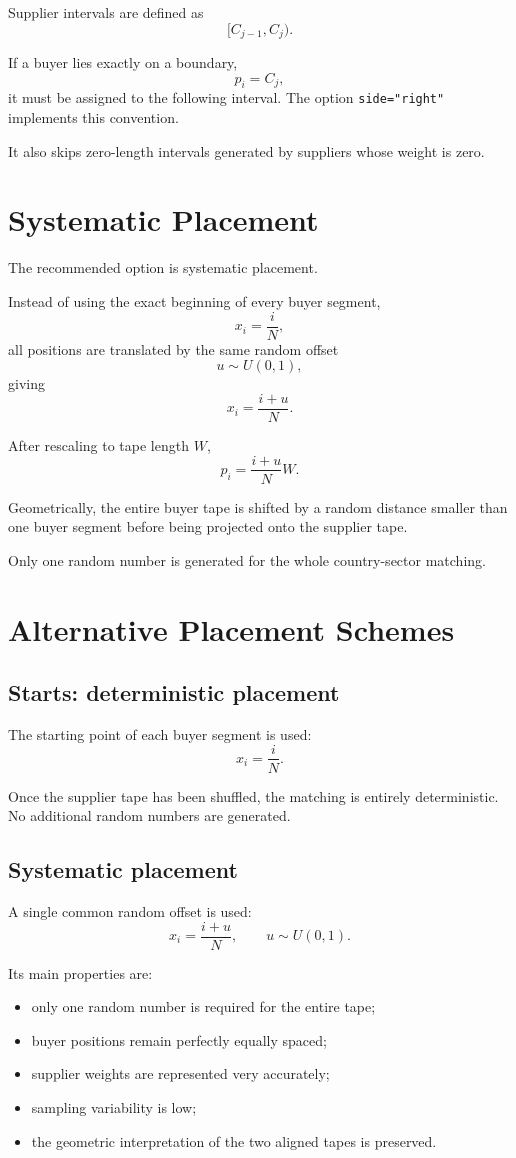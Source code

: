 \documentclass[11pt,a4paper]{article}
\begin{document}
Supplier intervals are defined as
\[
[C_{j-1},C_j).
\]

If a buyer lies exactly on a boundary,
\[
p_i=C_j,
\]
it must be assigned to the following interval. The option
\texttt{side="right"} implements this convention.

It also skips zero-length intervals generated by suppliers whose weight is
zero.

\section{Systematic Placement}

The recommended option is systematic placement.

Instead of using the exact beginning of every buyer segment,
\[
x_i=\frac{i}{N},
\]
all positions are translated by the same random offset
\[
u\sim U(0,1),
\]
giving
\[
x_i=\frac{i+u}{N}.
\]

After rescaling to tape length \(W\),
\[
p_i=\frac{i+u}{N}W.
\]

Geometrically, the entire buyer tape is shifted by a random distance smaller
than one buyer segment before being projected onto the supplier tape.

Only one random number is generated for the whole country-sector matching.

\section{Alternative Placement Schemes}

\subsection{Starts: deterministic placement}

The starting point of each buyer segment is used:
\[
x_i=\frac{i}{N}.
\]

Once the supplier tape has been shuffled, the matching is entirely
deterministic. No additional random numbers are generated.

\subsection{Systematic placement}

A single common random offset is used:
\[
x_i=\frac{i+u}{N},
\qquad u\sim U(0,1).
\]

Its main properties are:

\begin{itemize}
    \item only one random number is required for the entire tape;
    \item buyer positions remain perfectly equally spaced;
    \item supplier weights are represented very accurately;
    \item sampling variability is low;
    \item the geometric interpretation of the two aligned tapes is preserved.
\end{itemize}
\end{document}
